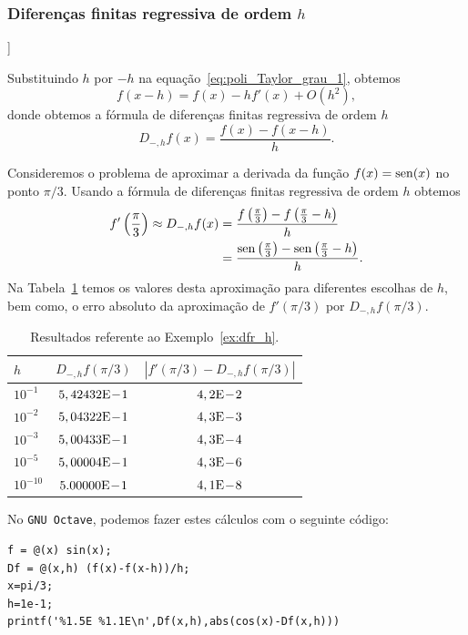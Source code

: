 \subsubsection{Diferenças finitas regressiva de ordem $h$}

\begin{flushleft}
  [[tag:revisar]]
\end{flushleft}

Substituindo $h$ por $-h$ na equação~\eqref{eq:poli_Taylor_grau_1}, obtemos
\begin{equation}
  f(x-h) = f(x) - hf'(x) + O(h^2),
\end{equation}
donde obtemos a fórmula de diferenças finitas regressiva de ordem $h$
\begin{equation}\label{eq:dfr_h}
  D_{-,h}f(x) = \frac{f(x) - f(x-h)}{h}.
\end{equation}

\begin{ex}\label{ex:dfr_h}
  Consideremos o problema de aproximar a derivada da função $f(x) = \operatorname{sen}(x)$ no ponto $\pi/3$. Usando a fórmula de diferenças finitas regressiva de ordem $h$ obtemos
  \begin{align}
    f'\left(\frac{\pi}{3}\right) \approx D_{-,h}f(x) &= \frac{f\left(\frac{\pi}{3}\right)-f\left(\frac{\pi}{3}-h\right)}{h}\\
          &= \frac{\operatorname{sen}\left(\frac{\pi}{3}\right)-\operatorname{sen}\left(\frac{\pi}{3}-h\right)}{h}. 
  \end{align}
Na Tabela~\ref{tab:ex_dfr_h} temos os valores desta aproximação para diferentes escolhas de $h$, bem como, o erro absoluto da aproximação de $f'(\pi/3)$ por $D_{-,h}f(\pi/3)$.

\begin{table}[h!]
  \centering
  \caption{Resultados referente ao Exemplo~\ref{ex:dfr_h}.}
  \begin{tabular}{l|c|c}
    $h$ & $D_{-,h}f(\pi/3)$ & $|f'(\pi/3)-D_{-,h}f(\pi/3)|$\\ \hline
    $10^{-1}$ & $5,42432\mathrm{E}\!-\!1$ & $4,2\mathrm{E}\!-\!2$ \\
    $10^{-2}$ & $5,04322\mathrm{E}\!-\!1$ & $4,3\mathrm{E}\!-\!3$ \\
    $10^{-3}$ & $5,00433\mathrm{E}\!-\!1$ & $4,3\mathrm{E}\!-\!4$ \\
    $10^{-5}$ & $5,00004\mathrm{E}\!-\!1$ & $4,3\mathrm{E}\!-\!6$ \\
    $10^{-10}$ & $5.00000\mathrm{E}\!-\!1$ & $4,1\mathrm{E}\!-\!8$ \\\hline
  \end{tabular}
  \label{tab:ex_dfr_h}
\end{table}

No \verb+GNU Octave+, podemos fazer estes cálculos com o seguinte código:
\begin{verbatim}
f = @(x) sin(x);
Df = @(x,h) (f(x)-f(x-h))/h;
x=pi/3;
h=1e-1;
printf('%1.5E %1.1E\n',Df(x,h),abs(cos(x)-Df(x,h)))
\end{verbatim}
\end{ex}

